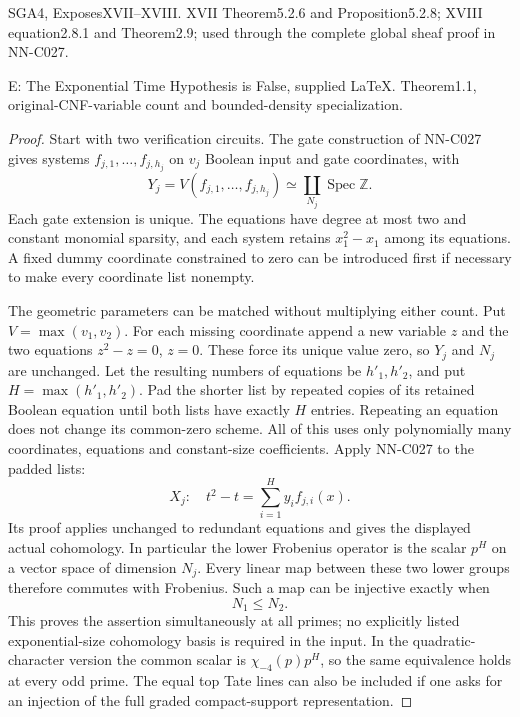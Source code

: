 SGA4, ExposesXVII--XVIII. XVII Theorem5.2.6 and Proposition5.2.8; XVIII equation2.8.1 and Theorem2.9; used through the complete global sheaf proof in NN-C027.

E: The Exponential Time Hypothesis is False, supplied LaTeX. Theorem1.1, original-CNF-variable count and bounded-density specialization.

\begin{proof}
Start with two verification circuits. The gate construction of NN-C027 gives systems $f_{j,1},\ldots,f_{j,h_j}$ on $v_j$ Boolean input and gate coordinates, with
\[
 Y_j=V(f_{j,1},\ldots,f_{j,h_j})\simeq
             \coprod_{N_j}\operatorname{Spec}\mathbb Z.
\]
Each gate extension is unique. The equations have degree at most two and constant monomial sparsity, and each system retains $x_1^2-x_1$ among its equations. A fixed dummy coordinate constrained to zero can be introduced first if necessary to make every coordinate list nonempty.

The geometric parameters can be matched without multiplying either count. Put $V=\max(v_1,v_2)$. For each missing coordinate append a new variable $z$ and the two equations $z^2-z=0$, $z=0$. These force its unique value zero, so $Y_j$ and $N_j$ are unchanged. Let the resulting numbers of equations be $h'_1,h'_2$, and put $H=\max(h'_1,h'_2)$. Pad the shorter list by repeated copies of its retained Boolean equation until both lists have exactly $H$ entries. Repeating an equation does not change its common-zero scheme. All of this uses only polynomially many coordinates, equations and constant-size coefficients. Apply NN-C027 to the padded lists:
\[
 X_j:\quad t^2-t=\sum_{i=1}^H y_i f_{j,i}(x).
\]
Its proof applies unchanged to redundant equations and gives the displayed actual cohomology. In particular the lower Frobenius operator is the scalar $p^H$ on a vector space of dimension $N_j$. Every linear map between these two lower groups therefore commutes with Frobenius. Such a map can be injective exactly when
\[
                         N_1\leq N_2.
\]
This proves the assertion simultaneously at all primes; no explicitly listed exponential-size cohomology basis is required in the input. In the quadratic-character version the common scalar is $\chi_{-4}(p)p^H$, so the same equivalence holds at every odd prime. The equal top Tate lines can also be included if one asks for an injection of the full graded compact-support representation.


\end{proof}
